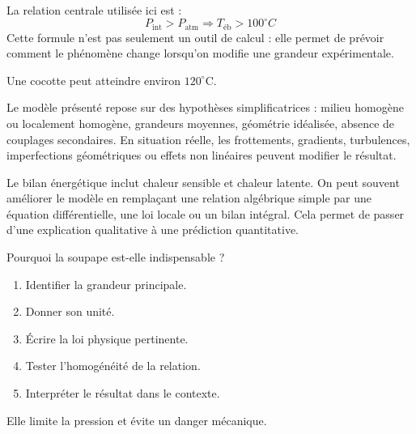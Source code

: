 \documentclass[11pt,a4paper]{article}
\begin{document}
\begin{theorembox}
La relation centrale utilisée ici est :
\[
P_{\mathrm{int}}>P_{\mathrm{atm}}\Rightarrow T_{\mathrm{éb}}>100^\circ C
\]
Cette formule n'est pas seulement un outil de calcul : elle permet de prévoir comment le phénomène change lorsqu'on modifie une grandeur expérimentale.
\end{theorembox}

\begin{odgbox}
Une cocotte peut atteindre environ $120^\circ$C.
\end{odgbox}

\begin{attentionbox}
Le modèle présenté repose sur des hypothèses simplificatrices : milieu homogène ou localement homogène, grandeurs moyennes, géométrie idéalisée, absence de couplages secondaires. En situation réelle, les frottements, gradients, turbulences, imperfections géométriques ou effets non linéaires peuvent modifier le résultat.
\end{attentionbox}

\begin{approfondissementbox}
Le bilan énergétique inclut chaleur sensible et chaleur latente.
On peut souvent améliorer le modèle en remplaçant une relation algébrique simple par une équation différentielle, une loi locale ou un bilan intégral. Cela permet de passer d'une explication qualitative à une prédiction quantitative.
\end{approfondissementbox}

\begin{exercicebox}
Pourquoi la soupape est-elle indispensable ?
\begin{enumerate}
  \item Identifier la grandeur principale.
  \item Donner son unité.
  \item Écrire la loi physique pertinente.
  \item Tester l'homogénéité de la relation.
  \item Interpréter le résultat dans le contexte.
\end{enumerate}
\end{exercicebox}

\begin{corrigebox}[Indication]
Elle limite la pression et évite un danger mécanique.
\end{corrigebox}
\end{document}
